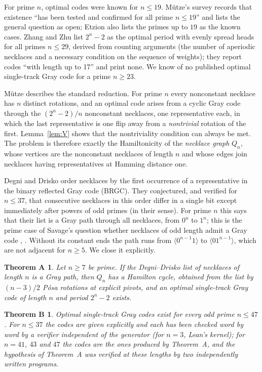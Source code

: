 \documentclass[11pt]{article}
\newtheorem*{theoremA}{Theorem A}
\newtheorem*{theoremB}{Theorem B}
\begin{document}
For prime $n$, optimal codes were known for $n\le 19$. M\"utze's survey \cite[Section 3.12]{Mut} records that existence
``has been tested and confirmed for all prime $n\le 19$'' and lists the general question as open; Etzion
\cite{Etz25} also lists the primes up to $19$ as the known cases. Zhang and Zhu \cite{ZZ08} list $2^n-2$ as the optimal
period with evenly spread heads for all primes $n\le 29$, derived from counting arguments (the number of aperiodic
necklaces and a necessary condition on the sequence of weights); they report codes ``with length up to 17'' and print
none. We know of no published optimal single-track Gray code for a prime $n\ge 23$.

M\"utze \cite[Section 3.12]{Mut} describes the standard reduction. For prime $n$ every nonconstant necklace has $n$
distinct rotations, and an optimal code arises from a cyclic Gray code through the $(2^n-2)/n$ nonconstant necklaces,
one representative each, in which the last representative is one flip away from a \emph{nontrivial} rotation of the
first. Lemma~\ref{lem:V} shows that the nontriviality condition can always be met. The problem is therefore exactly the
Hamiltonicity of the \emph{necklace graph} $Q_n$, whose vertices are the nonconstant necklaces of length $n$ and whose
edges join necklaces having representatives at Hamming distance one.

Degni and Drisko \cite{DD07} order necklaces by the first occurrence of a representative in the binary reflected Gray
code (BRGC). They conjectured, and verified for $n\le 37$, that consecutive necklaces in this order differ in a single
bit except immediately after powers of odd primes (in their sense). For prime $n$ this says that their list is a Gray
path through all necklaces, from $0^n$ to $1^n$; this is the prime case of Savage's question whether necklaces of odd
length admit a Gray code \cite{Sav97}, \cite[Problem P17]{Mut}. Without its constant ends the path runs from
$\langle 0^{n-1}1\rangle$ to $\langle 01^{n-1}\rangle$, which are not adjacent for $n\ge 5$. We close it
explicitly.

\begin{theoremA}
Let $n\ge 7$ be prime. If the Degni--Drisko list of necklaces of length $n$ is a Gray path, then $Q_n$ has a Hamilton
cycle, obtained from the list by $(n-3)/2$ P\'osa rotations at explicit pivots, and an optimal single-track Gray code
of length $n$ and period $2^n-2$ exists.
\end{theoremA}

\begin{theoremB}
Optimal single-track Gray codes exist for every odd prime $n\le 47$. For $n\le 37$ the codes are given explicitly and
each has been checked word by word by a verifier independent of the generator (for $n=3$, Lean's kernel); for $n=41$, $43$ and $47$ the codes are the ones
produced by Theorem~A, and the hypothesis of Theorem~A was verified at these lengths by two independently written
programs.
\end{theoremB}
\end{document}
